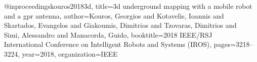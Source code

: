 @inproceedings{kouros20183d,
	title={3d underground mapping with a mobile robot and a gpr antenna},
	author={Kouros, Georgios and Kotavelis, Ioannis and Skartados, Evangelos and Giakoumis, Dimitrios and Tzovaras, Dimitrios and Simi, Alessandro and Manacorda, Guido},
	booktitle={2018 IEEE/RSJ International Conference on Intelligent Robots and Systems (IROS)},
	pages={3218--3224},
	year={2018},
	organization={IEEE}
}
